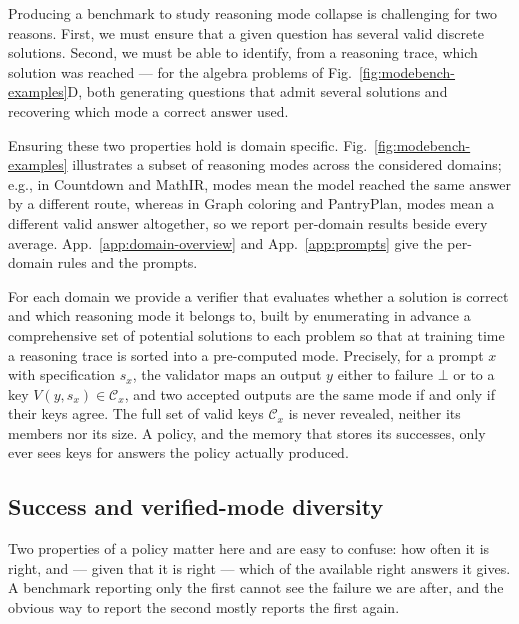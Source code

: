 \documentclass{article}
\newcommand{\1}{\mathbf 1}
\theoremstyle{remark}
\theoremstyle{definition}
\theoremstyle{plain}
\begin{document}

Producing a benchmark to study reasoning mode collapse is challenging for two
reasons. First, we must ensure that a given question has several valid discrete
solutions. Second, we must be able to identify, from a reasoning trace, which
solution was reached --- for the algebra problems of
Fig.~\ref{fig:modebench-examples}D, both generating questions that admit several
solutions and recovering which mode a correct answer used.

Ensuring these two properties hold is domain specific.
Fig.~\ref{fig:modebench-examples} illustrates a subset of reasoning modes across
the considered domains; e.g., in Countdown and MathIR, modes mean the model
reached the same answer by a different route, whereas
in Graph coloring and PantryPlan, modes mean a different valid answer
altogether, so we report per-domain results beside every average.
App.~\ref{app:domain-overview} and App.~\ref{app:prompts} give the per-domain
rules and the prompts.

For each domain we provide a verifier that evaluates whether a solution is
correct and which reasoning mode it belongs to, built by enumerating in advance
a comprehensive set of potential solutions to each problem so that at training
time a reasoning trace is sorted into a pre-computed mode. Precisely, for a
prompt $x$ with specification $s_x$, the validator maps an output $y$ either to
failure $\bot$ or to a key $V(y,s_x)\in\mathcal C_x$, and two accepted outputs
are the same mode if and only if their keys agree. The full set of valid keys
$\mathcal C_x$ is never revealed, neither its members nor its size. A policy,
and the memory that stores its successes, only ever sees keys for answers the
policy actually produced.

\subsection{Success and verified-mode diversity}
\label{sec:collapse-metrics}

Two properties of a policy matter here and are easy to confuse: how often it is
right, and --- given that it is right --- which of the available right answers
it gives. A benchmark reporting only the first cannot see the failure we are
after, and the obvious way to report the second mostly reports the first again.
\end{document}
